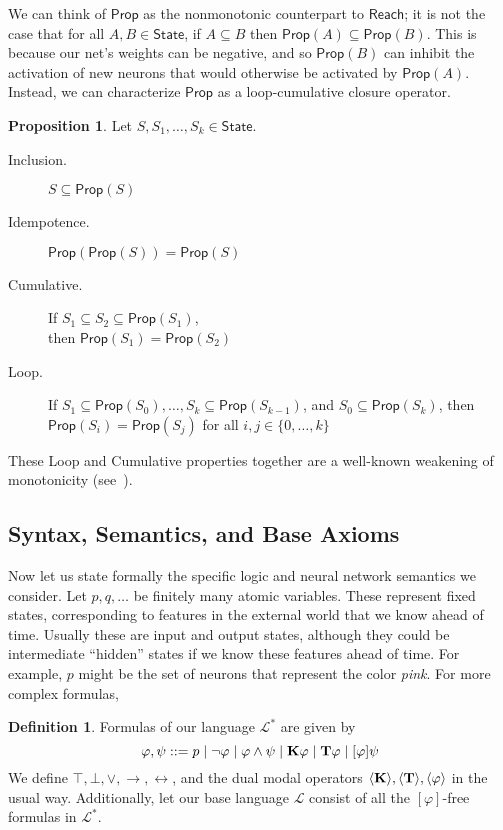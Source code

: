 \documentclass[letterpaper]{article}
\theoremstyle{definition}
\newtheorem{definition}{Definition}
\newtheorem{proposition}{Proposition}
\newcommand{\State}{\mathsf{State}}
\newcommand{\lang}{\mathcal{L}}
\newcommand{\uplang}{\mathcal{L}^\ast}
\newcommand{\set}[1]{\{ #1 \}}
\newcommand{\Prop}{\mathsf{Prop}}
\newcommand{\Reach}{\mathsf{Reach}}
\newcommand{\Typ}[1]{\textrm{\textup{\textbf{T}}} #1}
\newcommand{\Know}[1]{\textrm{\textup{\textbf{K}}} #1}
\newcommand{\Hebbop}[1]{[#1]}
\newcommand{\diaTyp}[1]{\langle \textrm{\textup{\textbf{T}}} \rangle #1}
\newcommand{\diaKnow}[1]{\langle \textrm{\textup{\textbf{K}}} \rangle #1}
\newcommand{\diaHebbop}[1]{\langle #1\rangle}
\begin{document}
We can think of $\Prop$ as the nonmonotonic counterpart to $\Reach$; it is not the case that for all $A, B \in \State$, if $A \subseteq B$ then $\Prop(A) \subseteq \Prop(B)$.  This is because our net's weights can be negative, and so $\Prop(B)$ can inhibit the activation of new neurons that would otherwise be activated by $\Prop(A)$.  Instead, we can characterize $\Prop$ as a loop-cumulative closure operator.
\begin{proposition}\cite{leitgeb2001nonmonotonic}\label{propagation-properties}
    Let $S, S_1, \ldots, S_k \in \State$.
    \begin{description}
        \item[Inclusion.] $S \subseteq \Prop(S)$
        \item[Idempotence.] $\Prop(\Prop(S)) = \Prop(S)$
        \item[Cumulative.] If $S_1 \subseteq S_2 \subseteq \Prop(S_1)$,\\ then $\Prop(S_1) = \Prop(S_2)$
        \item[Loop.] If $S_1 \subseteq \Prop(S_0), \ldots, S_k \subseteq \Prop(S_{k-1})$, and $S_0 \subseteq \Prop(S_k)$, then $\Prop(S_i) = \Prop(S_j)$ for all $i, j \in \set{0, \ldots, k}$
    \end{description}
\end{proposition}
These Loop and Cumulative properties together are a well-known weakening of monotonicity (see~\cite{kraus1990nonmonotonic}).

\subsection{Syntax, Semantics, and Base Axioms}

Now let us state formally the specific logic and neural network semantics we consider.  Let $p, q, \ldots$ be finitely many atomic variables. These represent fixed states, corresponding to features in the external world that we know ahead of time.  Usually these are input and output states, although they could be intermediate ``hidden'' states if we know these features ahead of time.  For example, $p$ might be the set of neurons that represent the color \emph{pink}.  For more complex formulas,
\begin{definition}
    Formulas of our language $\uplang$ are given by
    \[
        \varphi, \psi ::= p \mid \neg \varphi \mid \varphi \land \psi \mid \Know{\varphi} \mid \Typ{\varphi} \mid \Hebbop{\varphi} \psi
    \]
    We define $\top, \bot, \lor, \to, \leftrightarrow$, and the dual modal operators $\diaKnow, \diaTyp, \diaHebbop{\varphi}$ in the usual way.  Additionally, let our base language $\lang$ consist of all the $\Hebbop{\varphi}$-free formulas in $\uplang$.
\end{definition}
\end{document}
